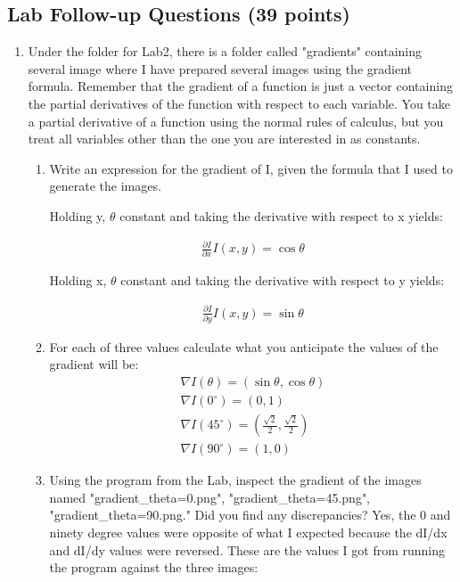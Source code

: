 \documentclass{article}
\begin{document}
\subsection{Lab Follow-up Questions (39 points)}
\begin{enumerate}

\item
Under the folder for Lab2, there is a folder called "gradients" containing several image where I have prepared several images using the gradient formula. Remember that the gradient of a function is just a vector containing the partial derivatives of the function with respect to each variable. You take a partial derivative of a function using the normal rules of calculus, but you treat all variables other than the one you are interested in as constants.


  \begin{enumerate}
    \item Write an expression for the gradient of I, given the formula that I used to generate the images.
    
    Holding y, \(\theta\) constant and taking the derivative with respect to x yields:
    
\begin{eqnarray*}
\frac{\partial I}{\partial x} I(x,y)=\cos \theta
\end{eqnarray*}    
    
        Holding x, \(\theta\)  constant and taking the derivative with respect to y yields:
    
\begin{eqnarray*}
\frac{\partial I}{\partial y} I(x,y)=\sin \theta
\end{eqnarray*}    

    \item For each of three values calculate what you anticipate the values of the gradient will be:
\begin{eqnarray*}
\nabla I \left( \theta \right)=\left( \sin \theta, \cos \theta \right)
\\\nabla I \left( 0 ^{\circ} \right)=\left(0,1\right)
\\\nabla I \left( 45  ^{\circ} \right)=\left(\frac{\sqrt 2}{2},\frac{\sqrt 2}{2}\right)
\\\nabla I \left( 90  ^{\circ} \right)=\left(1,0\right)
\end{eqnarray*}    

	\item Using the program from the Lab, inspect the gradient of the images named "gradient_theta=0.png", "gradient_theta=45.png", "gradient_theta=90.png." Did you find any discrepancies? 
	Yes, the 0 and ninety degree values were opposite of what I expected because the dI/dx and dI/dy values were reversed. These are the values I got from running the program against the three images:
	

\end{enumerate}
\end{enumerate}
\end{document}
